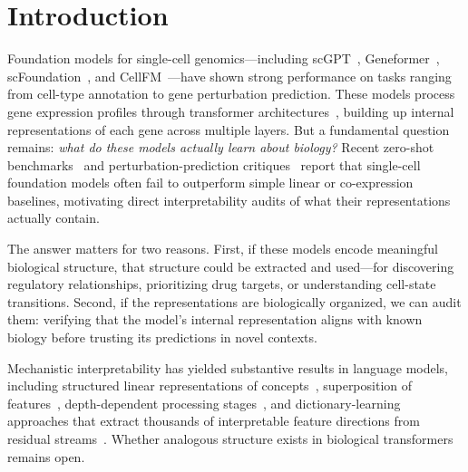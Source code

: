 \documentclass[12pt]{article}
\begin{document}
\section{Introduction}
\label{sec:intro}

Foundation models for single-cell genomics---including scGPT~\cite{cui2024scgpt}, Geneformer~\cite{theodoris2023transfer}, scFoundation~\cite{hao2024scfoundation}, and CellFM~\cite{zeng2025cellfm}---have shown strong performance on tasks ranging from cell-type annotation to gene perturbation prediction.
These models process gene expression profiles through transformer architectures~\cite{vaswani2017attention}, building up internal representations of each gene across multiple layers.
But a fundamental question remains: \emph{what do these models actually learn about biology?}
Recent zero-shot benchmarks~\cite{boyeau2025zeroshot} and perturbation-prediction critiques~\cite{csendes2025perturbation} report that single-cell foundation models often fail to outperform simple linear or co-expression baselines, motivating direct interpretability audits of what their representations actually contain.

The answer matters for two reasons.
First, if these models encode meaningful biological structure, that structure could be extracted and used---for discovering regulatory relationships, prioritizing drug targets, or understanding cell-state transitions.
Second, if the representations are biologically organized, we can audit them: verifying that the model's internal representation aligns with known biology before trusting its predictions in novel contexts.

Mechanistic interpretability has yielded substantive results in language models, including structured linear representations of concepts~\cite{park2023linear}, superposition of features~\cite{elhage2022toy}, depth-dependent processing stages~\cite{nanda2023progress}, and dictionary-learning approaches that extract thousands of interpretable feature directions from residual streams~\cite{bricken2023monosemanticity,templeton2024scaling}.
Whether analogous structure exists in biological transformers remains open.
\end{document}
